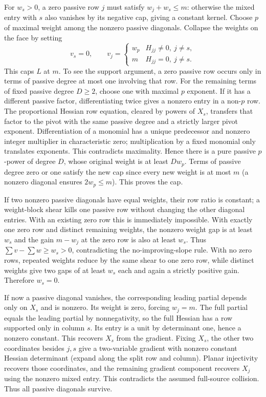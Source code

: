 \documentclass[11pt,a4paper]{article}
\begin{document}
For $w_s>0$, a zero passive row $j$ must satisfy $w_j+w_s\le m$: otherwise the mixed entry with $s$ also vanishes by its negative cap, giving a constant kernel. Choose $p$ of maximal weight among the nonzero passive diagonals. Collapse the weights on the face by setting
\[
 v_s=0,\qquad
 v_j=\begin{cases}
 w_p& H_{jj}\ne0,\ j\ne s,\\
 m& H_{jj}=0,\ j\ne s .
 \end{cases}
\]
This caps $L$ at $m$. To see the support argument, a zero passive row occurs only in terms of passive degree at most one involving that row. For the remaining terms of fixed passive degree $D\ge2$, choose one with maximal $p$ exponent. If it has a different passive factor, differentiating twice gives a nonzero entry in a non-$p$ row. The proportional Hessian row equation, cleared by powers of $X_s$, transfers that factor to the pivot with the same passive degree and a strictly larger pivot exponent. Differentiation of a monomial has a unique predecessor and nonzero integer multiplier in characteristic zero; multiplication by a fixed monomial only translates exponents. This contradicts maximality. Hence there is a pure passive $p$-power of degree $D$, whose original weight is at least $Dw_p$. Terms of passive degree zero or one satisfy the new cap since every new weight is at most $m$ (a nonzero diagonal ensures $2w_p\le m$). This proves the cap.

If two nonzero passive diagonals have equal weights, their row ratio is constant; a weight-block shear kills one passive row without changing the other diagonal entries. With an existing zero row this is immediately impossible. With exactly one zero row and distinct remaining weights, the nonzero weight gap is at least $w_s$ and the gain $m-w_j$ at the zero row is also at least $w_s$. Thus $\sum v-\sum w\ge w_s>0$, contradicting the no-improving-slope rule. With no zero rows, repeated weights reduce by the same shear to one zero row, while distinct weights give two gaps of at least $w_s$ each and again a strictly positive gain. Therefore $w_s=0$.

If now a passive diagonal vanishes, the corresponding leading partial depends only on $X_s$ and is nonzero. Its weight is zero, forcing $w_j=m$. The full partial equals the leading partial by nonnegativity, so the full Hessian has a row supported only in column $s$. Its entry is a unit by determinant one, hence a nonzero constant. This recovers $X_s$ from the gradient. Fixing $X_s$, the other two coordinates besides $j,s$ give a two-variable gradient with nonzero constant Hessian determinant (expand along the split row and column). Planar injectivity recovers those coordinates, and the remaining gradient component recovers $X_j$ using the nonzero mixed entry. This contradicts the assumed full-source collision. Thus all passive diagonals survive.
\end{document}
